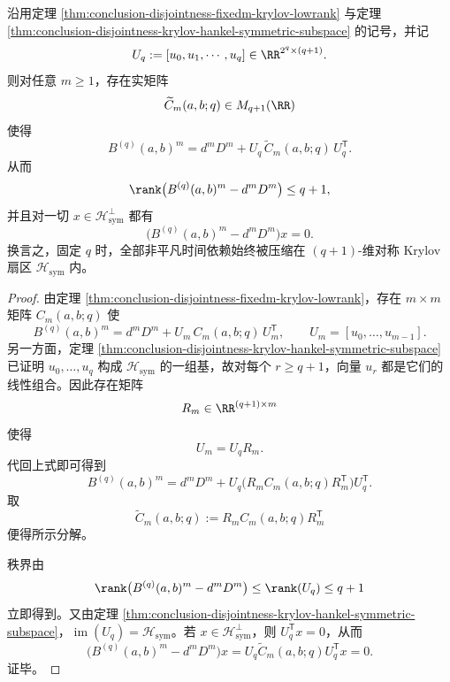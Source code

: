 \begin{theorem}\label{thm:conclusion-disjointness-fixedq-symmetric-krylov-sector}
沿用定理 \ref{thm:conclusion-disjointness-fixedm-krylov-lowrank} 与定理 \ref{thm:conclusion-disjointness-krylov-hankel-symmetric-subspace} 的记号，并记
\[
U_q:=[u_0,u_1,\cdots,u_q]\in\RR^{2^q\times(q+1)}.
\]
则对任意 \(m\ge 1\)，存在实矩阵
\[
\widetilde C_m(a,b;q)\in M_{q+1}(\RR)
\]
使得
\[
B^{(q)}(a,b)^m=d^m D^m+U_q\,\widetilde C_m(a,b;q)\,U_q^{\mathsf T}.
\]
从而
\[
\rank\bigl(B^{(q)}(a,b)^m-d^mD^m\bigr)\le q+1,
\]
并且对一切 \(x\in \mathcal H_{\mathrm{sym}}^\perp\) 都有
\[
\bigl(B^{(q)}(a,b)^m-d^mD^m\bigr)x=0.
\]
换言之，固定 \(q\) 时，全部非平凡时间依赖始终被压缩在 \((q+1)\)-维对称 Krylov 扇区 \(\mathcal H_{\mathrm{sym}}\) 内。
\end{theorem}
\begin{proof}
由定理 \ref{thm:conclusion-disjointness-fixedm-krylov-lowrank}，存在 \(m\times m\) 矩阵 \(C_m(a,b;q)\) 使
\[
B^{(q)}(a,b)^m=d^m D^m+U_m\,C_m(a,b;q)\,U_m^{\mathsf T},
\qquad
U_m=[u_0,\dots,u_{m-1}].
\]
另一方面，定理 \ref{thm:conclusion-disjointness-krylov-hankel-symmetric-subspace} 已证明 \(u_0,\dots,u_q\) 构成 \(\mathcal H_{\mathrm{sym}}\) 的一组基，故对每个 \(r\ge q+1\)，向量 \(u_r\) 都是它们的线性组合。因此存在矩阵
\[
R_m\in \RR^{(q+1)\times m}
\]
使得
\[
U_m=U_qR_m.
\]
代回上式即可得到
\[
B^{(q)}(a,b)^m
=
d^m D^m+U_q\bigl(R_mC_m(a,b;q)R_m^{\mathsf T}\bigr)U_q^{\mathsf T}.
\]
取
\[
\widetilde C_m(a,b;q):=R_mC_m(a,b;q)R_m^{\mathsf T}
\]
便得所示分解。

秩界由
\[
\rank\bigl(B^{(q)}(a,b)^m-d^mD^m\bigr)
\le
\rank(U_q)
\le q+1
\]
立即得到。又由定理 \ref{thm:conclusion-disjointness-krylov-hankel-symmetric-subspace}，\(\operatorname{im}(U_q)=\mathcal H_{\mathrm{sym}}\)。若 \(x\in \mathcal H_{\mathrm{sym}}^\perp\)，则 \(U_q^{\mathsf T}x=0\)，从而
\[
\bigl(B^{(q)}(a,b)^m-d^mD^m\bigr)x
=
U_q\widetilde C_m(a,b;q)U_q^{\mathsf T}x
=0.
\]
证毕。
\end{proof}

